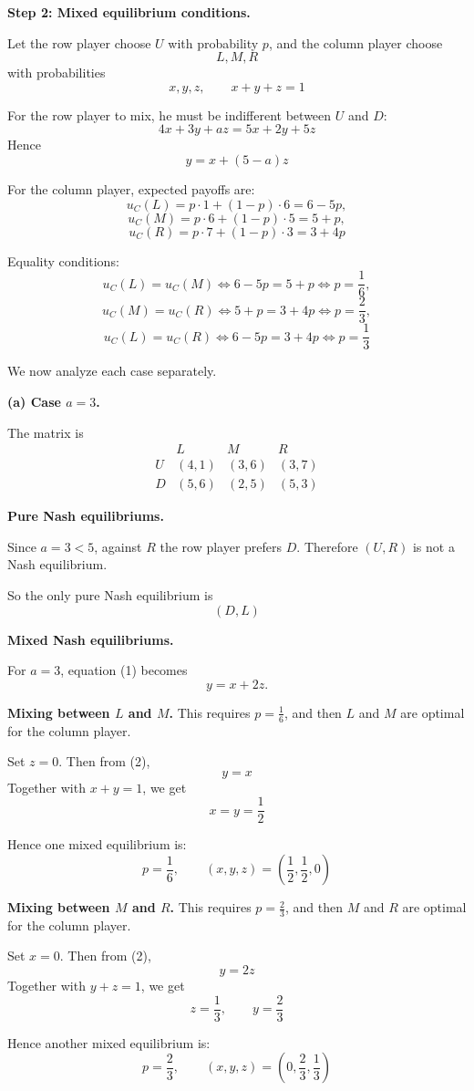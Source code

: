 \textbf{Step 2: Mixed equilibrium conditions.}

Let the row player choose \(U\) with probability \(p\), and the column player choose
\[
L,M,R
\]
with probabilities
\[
x,y,z,
\qquad x+y+z=1
\]

For the row player to mix, he must be indifferent between \(U\) and \(D\):
\[
4x+3y+az = 5x+2y+5z
\]
Hence
\[
y = x + (5-a)z \tag{1}
\]

For the column player, expected payoffs are:
\[
u_C(L)=p\cdot 1+(1-p)\cdot 6=6-5p,
\]
\[
u_C(M)=p\cdot 6+(1-p)\cdot 5=5+p,
\]
\[
u_C(R)=p\cdot 7+(1-p)\cdot 3=3+4p
\]

Equality conditions:
\[
u_C(L)=u_C(M) \iff 6-5p=5+p \iff p=\frac16,
\]
\[
u_C(M)=u_C(R) \iff 5+p=3+4p \iff p=\frac23,
\]
\[
u_C(L)=u_C(R) \iff 6-5p=3+4p \iff p=\frac13
\]

We now analyze each case separately.

\textbf{(a) Case \(a=3\).}

The matrix is
\[
\begin{array}{c|ccc}
 & L & M & R\\
\hline
U & (4,1) & (3,6) & (3,7)\\
D & (5,6) & (2,5) & (5,3)
\end{array}
\]

\textbf{Pure Nash equilibriums.}

Since \(a=3<5\), against \(R\) the row player prefers \(D\). Therefore \((U,R)\) is not a Nash equilibrium.

So the only pure Nash equilibrium is
\[
(D,L)
\]

\textbf{Mixed Nash equilibriums.}

For \(a=3\), equation (1) becomes
\[
y=x+2z. \tag{2}
\]

\textbf{Mixing between \(L\) and \(M\).}
This requires \(p=\frac16\), and then \(L\) and \(M\) are optimal for the column player.

Set \(z=0\). Then from (2),
\[
y=x
\]
Together with \(x+y=1\), we get
\[
x=y=\frac12
\]

Hence one mixed equilibrium is:
\[
p=\frac16,\qquad (x,y,z)=\left(\frac12,\frac12,0\right)
\]

\textbf{Mixing between \(M\) and \(R\).}
This requires \(p=\frac23\), and then \(M\) and \(R\) are optimal for the column player.

Set \(x=0\). Then from (2),
\[
y=2z
\]
Together with \(y+z=1\), we get
\[
z=\frac13,\qquad y=\frac23
\]

Hence another mixed equilibrium is:
\[
p=\frac23,\qquad (x,y,z)=\left(0,\frac23,\frac13\right)
\]

